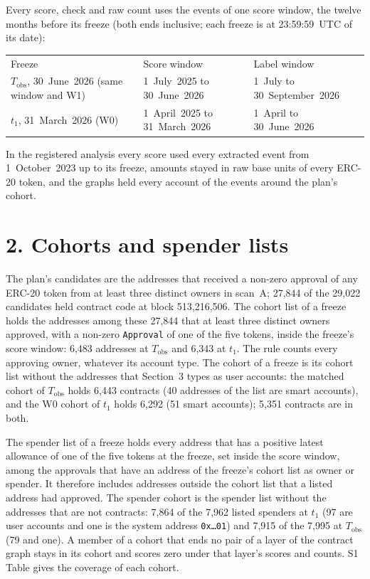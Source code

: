 \documentclass[10pt,letterpaper]{article}
\begin{document}
Every score, check and raw count uses the events of one score window, the twelve months before its freeze (both ends inclusive; each freeze is at 23:59:59~UTC of its date):

{\small\begin{tabular}{@{}lll@{}}
Freeze & Score window & Label window \\
$T_{\mathrm{obs}}$, 30~June~2026 (same window and W1) & 1~July~2025 to 30~June~2026 & 1~July to 30~September~2026 \\
$t_1$, 31~March~2026 (W0) & 1~April~2025 to 31~March~2026 & 1~April to 30~June~2026 \\
\end{tabular}}

In the registered analysis every score used every extracted event from 1~October~2023 up to its freeze, amounts stayed in raw base units of every ERC-20 token, and the graphs held every account of the events around the plan's cohort.

\section*{2. Cohorts and spender lists}
The plan's candidates are the addresses that received a non-zero approval of any ERC-20 token from at least three distinct owners in scan~A; 27,844 of the 29,022 candidates held contract code at block 513,216,506. The cohort list of a freeze holds the addresses among these 27,844 that at least three distinct owners approved, with a non-zero \texttt{Approval} of one of the five tokens, inside the freeze's score window: 6,483 addresses at $T_{\mathrm{obs}}$ and 6,343 at $t_1$. The rule counts every approving owner, whatever its account type. The cohort of a freeze is its cohort list without the addresses that Section~3 types as user accounts: the matched cohort of $T_{\mathrm{obs}}$ holds 6,443 contracts (40 addresses of the list are smart accounts), and the W0 cohort of $t_1$ holds 6,292 (51 smart accounts); 5,351 contracts are in both.

The spender list of a freeze holds every address that has a positive latest allowance of one of the five tokens at the freeze, set inside the score window, among the approvals that have an address of the freeze's cohort list as owner or spender. It therefore includes addresses outside the cohort list that a listed address had approved. The spender cohort is the spender list without the addresses that are not contracts: 7,864 of the 7,962 listed spenders at $t_1$ (97 are user accounts and one is the system address \texttt{0x\ldots{}01}) and 7,915 of the 7,995 at $T_{\mathrm{obs}}$ (79 and one). A member of a cohort that ends no pair of a layer of the contract graph stays in its cohort and scores zero under that layer's scores and counts. S1 Table gives the coverage of each cohort.
\end{document}
